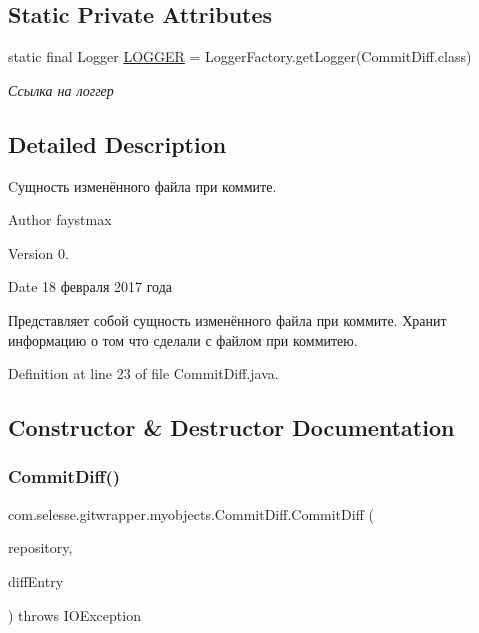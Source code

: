 \subsection*{Static Private Attributes}
\begin{DoxyCompactItemize}
\item 
static final Logger \hyperlink{classcom_1_1selesse_1_1gitwrapper_1_1myobjects_1_1_commit_diff_a6b58939c69fdcca2335aade2d3256582}{L\+O\+G\+G\+ER} = Logger\+Factory.\+get\+Logger(Commit\+Diff.\+class)
\begin{DoxyCompactList}\small\item\em Ссылка на логгер \end{DoxyCompactList}\end{DoxyCompactItemize}


\subsection{Detailed Description}
Cущность изменённого файла при коммите. 

\begin{DoxyAuthor}{Author}
faystmax 
\end{DoxyAuthor}
\begin{DoxyVersion}{Version}
0. 
\end{DoxyVersion}
\begin{DoxyDate}{Date}
18 февраля 2017 года 
\end{DoxyDate}
Представляет собой сущность изменённого файла при коммите. Хранит информацию о том что сделали с файлом при коммитею. 

Definition at line 23 of file Commit\+Diff.\+java.



\subsection{Constructor \& Destructor Documentation}
\mbox{\label{classcom_1_1selesse_1_1gitwrapper_1_1myobjects_1_1_commit_diff_a08bf17949cc65d48f54ee30e3a42b759}} 
\subsubsection{\texorpdfstring{Commit\+Diff()}{CommitDiff()}}
{\footnotesize\ttfamily com.\+selesse.\+gitwrapper.\+myobjects.\+Commit\+Diff.\+Commit\+Diff (\begin{DoxyParamCaption}\item[{Repository}]{repository,  }\item[{Diff\+Entry}]{diff\+Entry }\end{DoxyParamCaption}) throws I\+O\+Exception}

